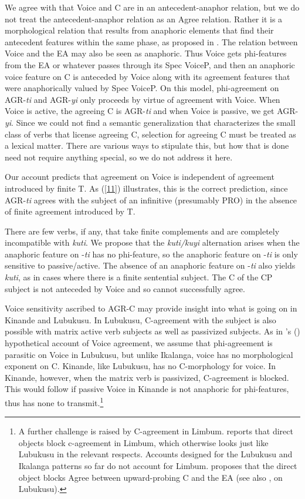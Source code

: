 \documentclass[output=paper,
modfonts
]{langscibook}
\begin{document}
We agree with \citeauthor{Diercks2017a} that Voice and C are in an antecedent-anaphor relation, but we do not treat the antecedent-anaphor relation as an Agree relation. Rather it is a morphological relation that results from anaphoric elements that find their antecedent features within the same phase, as proposed in \citet{Safir2014}. The relation between Voice and the EA may also be seen as anaphoric. Thus Voice gets phi-features from the EA or whatever passes through its Spec VoiceP, and then an anaphoric voice feature on C is anteceded by Voice along with its agreement features that were anaphorically valued by Spec VoiceP. On this model, phi-agreement on AGR-\textit{ti} and AGR-\textit{yi} only proceeds by virtue of agreement with Voice. When Voice is active, the agreeing C is AGR-\textit{ti} and when Voice is passive, we get AGR-\textit{yi}. Since we could not find a semantic generalization that characterizes the small class of verbs that license agreeing C, selection for agreeing C must be treated as a lexical matter. There are various ways to stipulate this, but how that is done need not require anything special, so we do not address it here.

Our account predicts that agreement on Voice is independent of agreement introduced by finite T. As (\ref{11}) illustrates, this is the correct prediction, since AGR-\textit{ti} agrees with the subject of an infinitive (presumably PRO) in the absence of finite agreement introduced by T.

	There are few verbs, if any, that take finite complements and are completely incompatible with \textit{kuti}. We propose that the \textit{kuti/kuyi} alternation arises when the anaphoric feature on -\textit{ti} has no phi-feature, so the anaphoric feature on -\textit{ti} is only sensitive to passive/active. The absence of an anaphoric feature on -\textit{ti} also yields \textit{kuti}, as in cases where there is a finite sentential subject. The C of the CP subject is not anteceded by Voice and so cannot successfully agree.
    
Voice sensitivity ascribed to AGR-C may provide insight into what is going on in Kinande and Lubukusu. In Lubukusu, C-agreement with the subject is also possible with matrix active verb subjects as well as passivized subjects. As in \citeauthor{Diercks2010}’s (\citeyear{Diercks2010}) hypothetical account of Voice agreement, we assume that phi-agreement is parasitic on Voice in Lubukusu, but unlike Ikalanga, voice has no morphological exponent on C. Kinande, like Lubukusu, has no C-morphology for voice. In Kinande, however, when the matrix verb is passivized, C-agreement is blocked. This would follow if passive Voice in Kinande is not anaphoric for phi-features, thus has none to transmit.\footnote{A further challenge is raised by C-agreement in Limbum. \citet{Nformi2017a} reports that direct objects block c-agreement in Limbum, which otherwise looks just like Lubukusu in the relevant respects. Accounts designed for the Lubukusu and Ikalanga patterns so far do not account for Limbum. \citeauthor{Nformi2017a} proposes that the direct object blocks Agree between upward-probing C and the EA (see also \citealt{Carstens2016}, on Lubukusu).}
\end{document}

